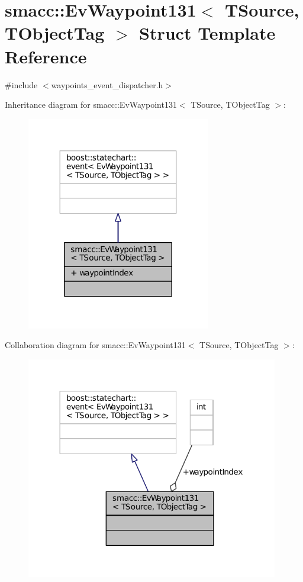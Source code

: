 \hypertarget{structsmacc_1_1EvWaypoint131}{}\section{smacc\+:\+:Ev\+Waypoint131$<$ T\+Source, T\+Object\+Tag $>$ Struct Template Reference}
\label{structsmacc_1_1EvWaypoint131}


{\ttfamily \#include $<$waypoints\+\_\+event\+\_\+dispatcher.\+h$>$}



Inheritance diagram for smacc\+:\+:Ev\+Waypoint131$<$ T\+Source, T\+Object\+Tag $>$\+:
\nopagebreak
\begin{figure}[H]
\begin{center}
\leavevmode
\includegraphics[width=227pt]{structsmacc_1_1EvWaypoint131__inherit__graph}
\end{center}
\end{figure}


Collaboration diagram for smacc\+:\+:Ev\+Waypoint131$<$ T\+Source, T\+Object\+Tag $>$\+:
\nopagebreak
\begin{figure}[H]
\begin{center}
\leavevmode
\includegraphics[width=312pt]{structsmacc_1_1EvWaypoint131__coll__graph}
\end{center}
\end{figure}
